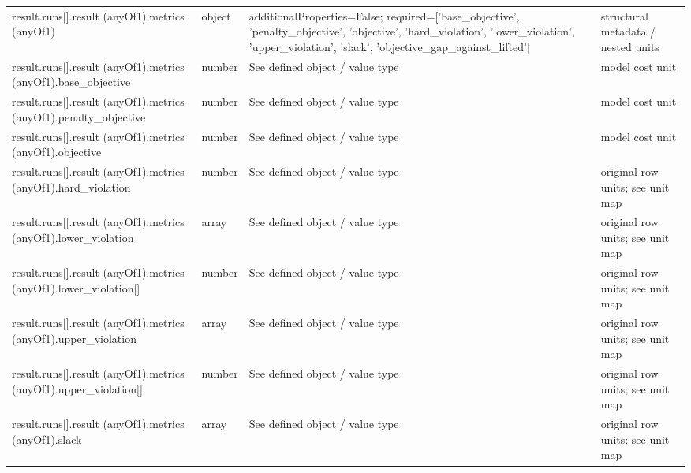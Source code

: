 \begin{longtable}{@{}>{\raggedright\arraybackslash}p{}>{\raggedright\arraybackslash}p{}>{\raggedright\arraybackslash}p{}>{\raggedright\arraybackslash}p{}@{}}
result.\allowbreak{}runs[].\allowbreak{}result (anyOf1).\allowbreak{}metrics (anyOf1) & object & additionalProperties=\allowbreak{}False; required=\allowbreak{}['base\_\allowbreak{}objective', 'penalty\_\allowbreak{}objective', 'objective', 'hard\_\allowbreak{}violation', 'lower\_\allowbreak{}violation', 'upper\_\allowbreak{}violation', 'slack', 'objective\_\allowbreak{}gap\_\allowbreak{}against\_\allowbreak{}lifted'] & structural metadata /\allowbreak{} nested units\\
result.\allowbreak{}runs[].\allowbreak{}result (anyOf1).\allowbreak{}metrics (anyOf1).\allowbreak{}base\_\allowbreak{}objective & number & See defined object /\allowbreak{} value type & model cost unit\\
result.\allowbreak{}runs[].\allowbreak{}result (anyOf1).\allowbreak{}metrics (anyOf1).\allowbreak{}penalty\_\allowbreak{}objective & number & See defined object /\allowbreak{} value type & model cost unit\\
result.\allowbreak{}runs[].\allowbreak{}result (anyOf1).\allowbreak{}metrics (anyOf1).\allowbreak{}objective & number & See defined object /\allowbreak{} value type & model cost unit\\
result.\allowbreak{}runs[].\allowbreak{}result (anyOf1).\allowbreak{}metrics (anyOf1).\allowbreak{}hard\_\allowbreak{}violation & number & See defined object /\allowbreak{} value type & original row units; see unit map\\
result.\allowbreak{}runs[].\allowbreak{}result (anyOf1).\allowbreak{}metrics (anyOf1).\allowbreak{}lower\_\allowbreak{}violation & array & See defined object /\allowbreak{} value type & original row units; see unit map\\
result.\allowbreak{}runs[].\allowbreak{}result (anyOf1).\allowbreak{}metrics (anyOf1).\allowbreak{}lower\_\allowbreak{}violation[] & number & See defined object /\allowbreak{} value type & original row units; see unit map\\
result.\allowbreak{}runs[].\allowbreak{}result (anyOf1).\allowbreak{}metrics (anyOf1).\allowbreak{}upper\_\allowbreak{}violation & array & See defined object /\allowbreak{} value type & original row units; see unit map\\
result.\allowbreak{}runs[].\allowbreak{}result (anyOf1).\allowbreak{}metrics (anyOf1).\allowbreak{}upper\_\allowbreak{}violation[] & number & See defined object /\allowbreak{} value type & original row units; see unit map\\
result.\allowbreak{}runs[].\allowbreak{}result (anyOf1).\allowbreak{}metrics (anyOf1).\allowbreak{}slack & array & See defined object /\allowbreak{} value type & original row units; see unit map\\

\end{longtable}
